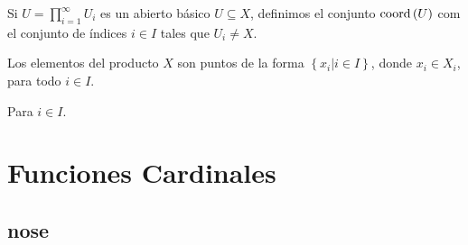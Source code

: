 \documentclass[12pt]{report}
\theoremstyle{largebreak}
\newcommand{\coord}[1]{\ensuremath{\textup{coord}\left(#1\right)}}
\begin{document}
    Si $U=\prod_{i=1}^{\infty}U_i$ es un abierto básico $U\subseteq X$, definimos el conjunto $\coord{U}$ com el conjunto de índices $i\in I$ tales que $U_i\neq X$.

    Los elementos del producto $X$ son puntos de la forma $\left\{x_i|i\in I \right\}$, donde $x_i\in X_i$, para todo $i\in I$.

    Para $i\in I$.


    \chapter{Funciones Cardinales}

    \section{nose}
\end{document}
